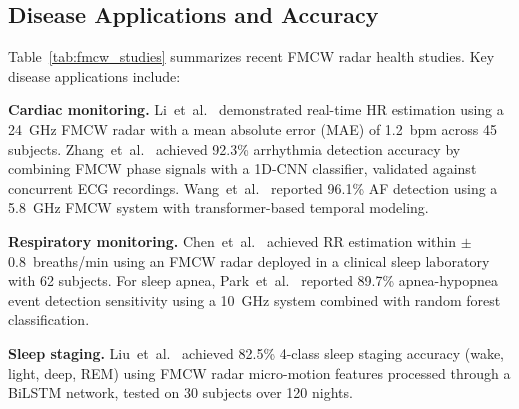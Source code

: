 \documentclass[journal,twoside]{IEEEtran}
\begin{document}
\subsection{Disease Applications and Accuracy}
Table~\ref{tab:fmcw_studies} summarizes recent FMCW radar health studies. Key disease applications include:

\textbf{Cardiac monitoring.} Li~et~al.~\cite{ref_li_fmcw2024} demonstrated real-time HR estimation using a 24~GHz FMCW radar with a mean absolute error (MAE) of 1.2~bpm across 45 subjects. Zhang~et~al.~\cite{ref_zhang_arrhythmia2024} achieved 92.3\% arrhythmia detection accuracy by combining FMCW phase signals with a 1D-CNN classifier, validated against concurrent ECG recordings. Wang~et~al.~\cite{ref_wang_cardiac2025} reported 96.1\% AF detection using a 5.8~GHz FMCW system with transformer-based temporal modeling.

\textbf{Respiratory monitoring.} Chen~et~al.~\cite{ref_chen_resp2024} achieved RR estimation within $\pm$0.8~breaths/min using an FMCW radar deployed in a clinical sleep laboratory with 62 subjects. For sleep apnea, Park~et~al.~\cite{ref_park_apnea2023} reported 89.7\% apnea-hypopnea event detection sensitivity using a 10~GHz system combined with random forest classification.

\textbf{Sleep staging.} Liu~et~al.~\cite{ref_liu_sleep2024} achieved 82.5\% 4-class sleep staging accuracy (wake, light, deep, REM) using FMCW radar micro-motion features processed through a BiLSTM network, tested on 30 subjects over 120 nights.
\end{document}
